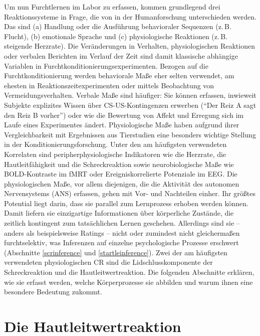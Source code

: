 	Um nun Furchtlernen im Labor zu erfassen, kommen grundlegend drei Reaktionssysteme in Frage, die von \textcite{BRADLEY2000} in der Humanforschung unterschieden werden. Das sind (a) Handlung oder die Ausführung behavioraler Sequenzen (z.\,B. Flucht), (b) emotionale Sprache und (c) physiologische Reaktionen (z.\,B. steigende Herzrate). Die Veränderungen in Verhalten, physiologischen Reaktionen oder verbalen Berichten im Verlauf der Zeit sind damit klassische abhängige Variablen in Furchtkonditionierungsexperimenten.
	Bezogen auf die Furchtkonditionierung werden behaviorale Maße eher selten verwendet, am ehesten in Reaktionszeitexperimenten oder mittels Beobachtung von Vermeidungsverhalten. Verbale Maße sind häufiger: Sie können erfassen, inwieweit Subjekte explizites Wissen über CS-US-Kontingenzen erwerben ("`Der Reiz A sagt den Reiz B vorher"') oder wie die Bewertung von Affekt und Erregung sich im Laufe eines Experimentes ändert. 
	Physiologische Maße haben aufgrund ihrer Vergleichbarkeit mit Ergebnissen aus Tierstudien eine besonders wichtige Stellung in der Konditionierungsforschung. Unter den am häufigsten verwendeten Korrelaten sind peripherphysiologische Indikatoren wie die Herzrate, die Hautleitfähigkeit und die Schreckreaktion sowie neurobiologische Maße wie BOLD-Kontraste im fMRT oder Ereigniskorrelierte Potenziale im EEG. Die physiologischen Maße, vor allem diejenigen, die die Aktivität des autonomen Nervensystems (ANS) erfassen, gehen mit Vor- und Nachteilen einher. Ihr größtes Potential liegt darin, dass sie parallel zum Lernprozess erhoben werden können. Damit liefern sie einzigartige Informationen über körperliche Zustände, die zeitlich kontingent zum tatsächlichen Lernen geschehen. Allerdings sind sie -- anders als beispielsweise Ratings -- nicht oder zumindest nicht gleichermaßen furchtselektiv, was Inferenzen auf einzelne psychologische Prozesse erschwert (Abschnitte \ref{scrinference} und \ref{startleinference}).
	Zwei der am häufigsten verwendeten physiologischen CR sind die Lidschlusskomponente der Schreckreaktion und die Hautleitwertreaktion. Die folgenden Abschnitte erklären, wie sie erfasst werden, welche Körperprozesse sie abbilden und warum ihnen eine besondere Bedeutung zukommt.
	


\section{Die Hautleitwertreaktion}		\label{scr}

